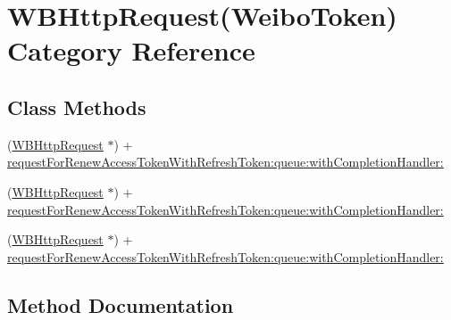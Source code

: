 \hypertarget{category_w_b_http_request_07_weibo_token_08}{}\section{W\+B\+Http\+Request(Weibo\+Token) Category Reference}
\label{category_w_b_http_request_07_weibo_token_08}
\subsection*{Class Methods}
\begin{DoxyCompactItemize}
\item 
(\mbox{\hyperlink{interface_w_b_http_request}{W\+B\+Http\+Request}} $\ast$) + \mbox{\hyperlink{category_w_b_http_request_07_weibo_token_08_a64ee3aba6d2b2251083753cef8ad4002}{request\+For\+Renew\+Access\+Token\+With\+Refresh\+Token\+:queue\+:with\+Completion\+Handler\+:}}
\item 
(\mbox{\hyperlink{interface_w_b_http_request}{W\+B\+Http\+Request}} $\ast$) + \mbox{\hyperlink{category_w_b_http_request_07_weibo_token_08_a64ee3aba6d2b2251083753cef8ad4002}{request\+For\+Renew\+Access\+Token\+With\+Refresh\+Token\+:queue\+:with\+Completion\+Handler\+:}}
\item 
(\mbox{\hyperlink{interface_w_b_http_request}{W\+B\+Http\+Request}} $\ast$) + \mbox{\hyperlink{category_w_b_http_request_07_weibo_token_08_a64ee3aba6d2b2251083753cef8ad4002}{request\+For\+Renew\+Access\+Token\+With\+Refresh\+Token\+:queue\+:with\+Completion\+Handler\+:}}
\end{DoxyCompactItemize}


\subsection{Method Documentation}
\mbox{\label{category_w_b_http_request_07_weibo_token_08_a64ee3aba6d2b2251083753cef8ad4002}} 
